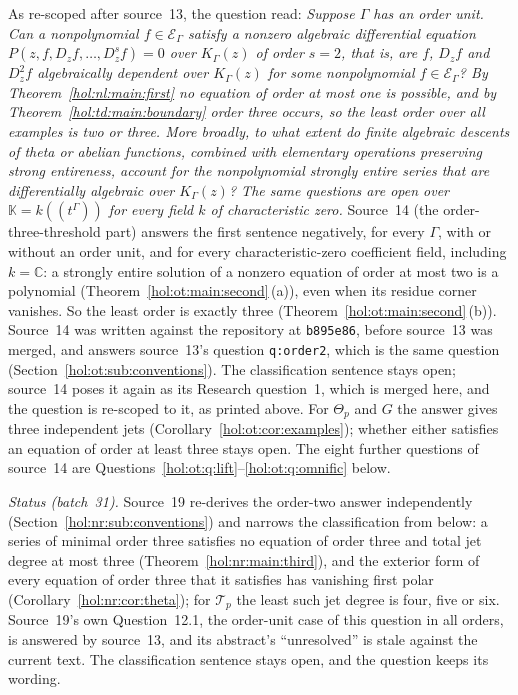 \documentclass[11pt]{article}
\numberwithin{equation}{section}
\theoremstyle{definition}
\theoremstyle{remark}
\newcommand{\C}{\mathbb C}
\newcommand{\K}{K_\Gamma}
\newcommand{\E}{\mathcal E_\Gamma}
\newcommand{\KK}{\mathbb K}
\begin{document}
As re-scoped after source~13, the question read: \emph{Suppose $\Gamma$ has an
order unit. Can a nonpolynomial $f\in\E$ satisfy a nonzero algebraic
differential equation $P(z,f,D_zf,\ldots,D_z^sf)=0$ over $\K(z)$ of order
$s=2$, that is, are $f$, $D_zf$ and $D_z^2f$ algebraically dependent over
$\K(z)$ for some nonpolynomial $f\in\E$? By Theorem~\ref{hol:nl:main:first}
no equation of order at most one is possible, and by
Theorem~\ref{hol:td:main:boundary} order three occurs, so the least order over
all examples is two or three. More broadly, to what extent do finite algebraic
descents of theta or abelian functions, combined with elementary operations
preserving strong entireness, account for the nonpolynomial strongly entire
series that are differentially algebraic over $\K(z)$? The same questions are
open over $\KK=k((t^\Gamma))$ for every field $k$ of characteristic zero.}
Source~14 (the order-three-threshold part) answers the first sentence
negatively, for every $\Gamma$, with or without an order unit, and for every
characteristic-zero coefficient field, including $k=\C$: a strongly entire
solution of a nonzero equation of order at most two is a polynomial
(Theorem~\ref{hol:ot:main:second}\,(a)), even when its residue corner
vanishes. So the least order is exactly three
(Theorem~\ref{hol:ot:main:second}\,(b)). Source~14 was written against the
repository at \texttt{b895e86}, before source~13 was merged, and answers
source~13's question \texttt{q:order2}, which is the same question
(Section~\ref{hol:ot:sub:conventions}). The classification sentence stays
open; source~14 poses it again as its Research question~1, which is merged
here, and the question is re-scoped to it, as printed above. For $\Theta_p$
and $G$ the answer gives three independent jets
(Corollary~\ref{hol:ot:cor:examples}); whether either satisfies an equation of
order at least three stays open. The eight further questions of source~14 are
Questions~\ref{hol:ot:q:lift}--\ref{hol:ot:q:omnific} below.

\emph{Status (batch~31).} Source~19 re-derives the order-two answer
independently (Section~\ref{hol:nr:sub:conventions}) and narrows the
classification from below: a series of minimal order three satisfies no
equation of order three and total jet degree at most three
(Theorem~\ref{hol:nr:main:third}), and the exterior form of every equation of
order three that it satisfies has vanishing first polar
(Corollary~\ref{hol:nr:cor:theta}); for $\mathcal T_p$ the least such jet
degree is four, five or six. Source~19's own Question~12.1, the order-unit
case of this question in all orders, is answered by source~13, and its
abstract's ``unresolved'' is stale against the current text. The
classification sentence stays open, and the question keeps its wording.
\end{document}
